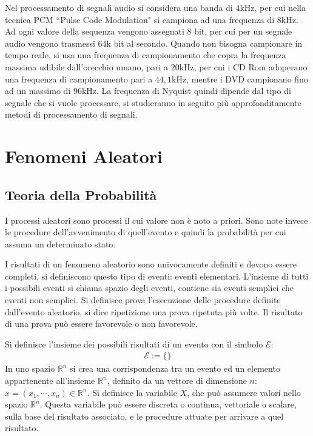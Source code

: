 \documentclass{article}
\numberwithin{equation}{subsection}
\begin{document}
Nel processamento di segnali audio si considera una banda di $4$kHz, per cui nella tecnica PCM ``Pulse Code Modulation" si campiona ad una frequenza di $8$kHz. 
Ad ogni valore della sequenza vengono assegnati $8$ bit, per cui per un segnale audio vengono trasmessi $64$k bit al secondo. 
Quando non bisogna campionare in tempo reale, si usa una frequenza di campionamento che copra la frequenza massima udibile dall'orecchio umano, pari a $20$kHz, per cui 
i CD Rom adoperano una frequenza di campionamento pari a $44,1$kHz, mentre i DVD campionano fino ad un massimo di $96$kHz. La frequenza di Nyquist quindi dipende dal tipo 
di segnale che si vuole processare, si studieranno in seguito più approfonditamente metodi di processamento di segnali. 

\clearpage

\section{Fenomeni Aleatori}

\subsection{Teoria della Probabilità}


I processi aleatori sono processi il cui valore non è noto a priori. Sono note invece le procedure dell'avvenimento di quell'evento e quindi la probabilità per cui assuma un 
determinato stato. 

I risultati di un fenomeno aleatorio sono univocamente definiti e devono essere completi, si definiscono questo tipo di eventi: eventi elementari. 
L'insieme di tutti i possibili eventi si chiama spazio degli eventi, contiene sia eventi semplici che eventi non semplici. 
Si definisce prova l'esecuzione delle procedure definite dall'evento aleatorio, si dice ripetizione una prova ripetuta più volte. Il risultato di una prova può essere favorevole 
o non favorevole. 

Si definisce l'insieme dei possibili risultati di un evento con il simbolo $\mathscr{E}$:
\begin{gather}
    \mathscr{E}:=\{\}
\end{gather}
In uno spazio $\mathbb{R}^n$ si crea una corrispondenza tra un evento ed un elemento appartenente all'insieme $\mathbb{R}^n$, 
definito da un vettore di dimensione $n$: $\underline{x}=(x_1,\cdots,x_n)\in\mathbb{R}^n$. 
Si definisce la variabile $X$, che può assumere valori nello spazio $\mathbb{R}^n$. Questa variabile può essere discreta o continua, 
vettoriale o scalare, sulla base del risultato associato, e le procedure attuate per arrivare a quel risultato. 
\end{document}
